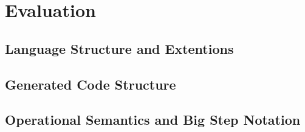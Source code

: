 \chapter{Evaluation}
\section{Language Structure and Extentions}
\section{Generated Code Structure}
\section{Operational Semantics and Big Step Notation}